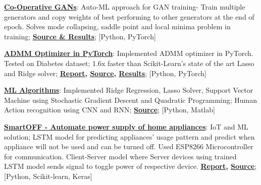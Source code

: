 \documentclass[a4paper, 11pt]{article}
\newcommand{\resumeItem}[2]{
  \item\small{
    \textbf{#1}{: #2 \vspace{-2pt}}
  }
}
\newcommand{\resumeSubItem}[2]{\resumeItem{#1}{#2}\vspace{-4pt}}
\begin{document}
    \resumeSubItem{\href{https://github.com/bhushan23/GAN/tree/master/Co-Operative-GAN}{Co-Operative GANs}}{Auto-ML approach for GAN training- Train multiple generators and copy weights of best performing to other generators at the end of epoch. Solves mode collapsing, saddle point and local minima problem in training;\textbf{ \href{https://github.com/bhushan23/GAN/tree/master/Co-Operative-GAN}{\underline{Source \& Results}}}; [Python, PyTorch]}
    \resumeSubItem{\href{https://github.com/bhushan23/pytorch/blob/1303c014dc3580654173c43fc6cf3409e4ef0438/torch/optim/admm.py}{ADMM Optimizer in PyTorch}}{Implemented ADMM optimizer in PyTorch. Tested on Diabetes dataset; 1.6x faster than Scikit-Learn's state of the art Lasso and Ridge solver; \textbf{\href{https://github.com/bhushan23/ADMM/blob/master/REPORT_ADMM_IN_PYTORCH.pdf}{\underline{Report}}, \href{https://github.com/bhushan23/pytorch/blob/1303c014dc3580654173c43fc6cf3409e4ef0438/torch/optim/admm.py}{\underline{Source}}, \href{https://github.com/bhushan23/ADMM}{\underline{Results}}}; [Python, PyTorch]}
    \resumeSubItem{\href{https://github.com/bhushan23/SBU-ML-Assignment}{ML Algorithms}}{Implemented Ridge Regression, Lasso Solver, Support Vector Machine using Stochastic Gradient Descent and Quadratic Programming; Human Action recognition using CNN and RNN; \textbf{\href{https://github.com/bhushan23/SBU-ML-Assignment}{\underline{Source}}}; [Python, Matlab]}
    \resumeSubItem{\href{https://github.com/bhushan23/SmartOff}{SmartOFF - Automate power supply of home appliances}} {IoT and ML solution; LSTM model for predicting appliances' usage pattern and predict when appliance will not be used and can be turned off. Used ESP8266 Microcontroller for communication. Client-Server model where Server devices using trained LSTM model sends signal to toggle power of respective device. \textbf{\href{https://github.com/bhushan23/SmartOff/tree/master/Reports}{\underline{Report}}, \href{https://github.com/bhushan23/SmartOff}{\underline{Source}}}; [Python, Scikit-learn, Keras]}
\end{document}
